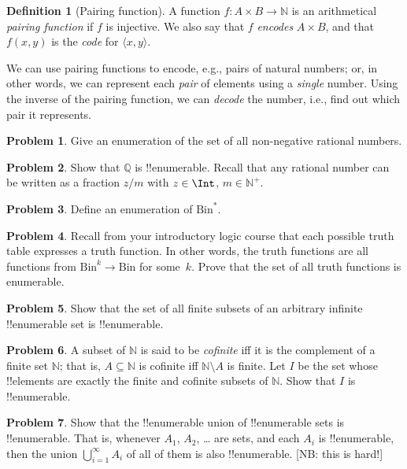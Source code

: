 \documentclass[10pt,a4paper]{article}
\theoremstyle{plain}
\theoremstyle{definition}
\newtheorem{defn}[thm]{Definition}
\newtheorem{prob}{Problem}[section]
\theoremstyle{remark}
\newenvironment{explain}{}{}
\providecommand{\tuple}[1]{\langle #1 \rangle}
\providecommand{\Nat}{\ensuremath{\mathbb{N}}}
\providecommand{\Rat}{\mathbb{Q}}
\providecommand{\Bin}{\mathrm{Bin}}
\begin{document}
\begin{defn}[Pairing function] 
  A function $f\colon A \times B \to \Nat$ is an arithmetical
  \emph{pairing function} if $f$ is injective. We also say that $f$
  \emph{encodes} $A \times B$, and that $f(x,y)$ is the
  \emph{code} for $\tuple{x,y}$.
\end{defn}

\begin{explain}
We can use pairing functions to encode, e.g., pairs of natural numbers;
or, in other words, we can represent each \emph{pair} of elements
using a \emph{single} number. Using the inverse of the pairing
function, we can \emph{decode} the number, i.e., find out which
pair it represents.
\end{explain}

\begin{prob}
Give an enumeration of the set of all non-negative rational numbers. 
\end{prob}

\begin{prob}
Show that $\Rat$ is !!{enumerable}. Recall that any rational number 
can be written as a fraction $z/m$ with $z \in \Int$, $m \in \Nat^+$.
\end{prob}

\begin{prob}
Define an enumeration of $\Bin^*$.
\end{prob}

\begin{prob}
Recall from your introductory logic course that each possible truth
table expresses a truth function. In other words, the truth functions
are all functions from $\Bin^k \to \Bin$ for some~$k$. Prove that the
set of all truth functions is enumerable.
\end{prob}

\begin{prob}
Show that the set of all finite subsets of an arbitrary infinite
!!{enumerable} set is !!{enumerable}.
\end{prob}

\begin{prob}
A subset of $\Nat$ is said to be \emph{cofinite} iff it is the
complement of a finite set $\Nat$; that is, $A \subseteq \Nat$ is
cofinite iff $\Nat\setminus A$ is finite. Let $I$ be the set whose
!!{element}s are exactly the finite and cofinite subsets of $\Nat$.
Show that $I$ is !!{enumerable}.
\end{prob}

\begin{prob}
Show that the !!{enumerable} union of !!{enumerable} sets is
!!{enumerable}. That is, whenever $A_1$, $A_2$, \dots{} are sets, and
each $A_i$ is !!{enumerable}, then the union $\bigcup_{i=1}^\infty
A_i$ of all of them is also !!{enumerable}. [NB: this is hard!]
\end{prob}
\end{document}
